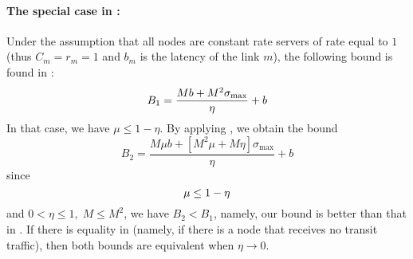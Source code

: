 \paragraph{The special case in \cite{tg96}: }
Under the assumption that all nodes are constant rate servers of
rate equal to $1$ (thus $C_m=r_m=1$ and $b_m$ is the latency of
the link $m$), the following bound is found in \cite{tg96}:
\begin{equation}\mylabel{eq-tg96}
  B_1= \frac{M b + M^2 \sigma_{\max}}{\eta}+ b
\end{equation}
In that case, we have $\mu \leq 1 - \eta$. By applying
, we obtain the bound
$$B_2 = \frac{M \mu b + \left[ M^2 \mu + M \eta
\right]\sigma_{\max}}{\eta} + b
$$
since
\begin{equation}\mylabel{eq-ringsig}
  \mu \leq 1-\eta
\end{equation}
and $0< \eta \leq 1, \; M \leq M^2$, we have $B_2 <B_1$, namely,
our bound is better than that in \cite{tg96}. If there is equality
in  (namely, if there is a node that receives no
transit traffic), then both bounds are equivalent when $\eta
\rightarrow 0$. 
%
